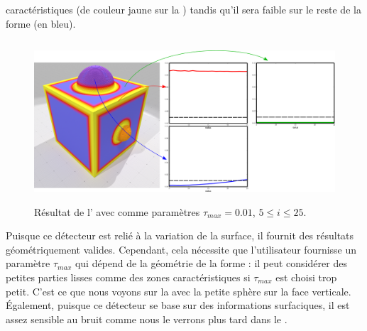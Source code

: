 caractéristiques (de couleur jaune sur la )
tandis qu'il sera faible sur le reste de la forme (en bleu).
%
\begin{figure}[ht]{
  \begin{center}
    \includegraphics[height=6cm]{figures/CubeSpherePlotPauly}
  \end{center}}
    \caption[Résultat de l']{Résultat de l' avec comme paramètres $\tau_{max} = 0.01$, $5 \le i \le 25$.
    \label{fig:pauly-cubesphere}}
\end{figure}
%
Puisque ce détecteur est relié à la variation de la surface, il fournit des
résultats géométriquement valides. Cependant, cela nécessite que l'utilisateur
fournisse un paramètre $\tau_{max}$ qui dépend de la géométrie de la forme : il
peut considérer des petites parties lisses comme des zones caractéristiques si
$\tau_{max}$ est choisi trop petit. C'est ce que nous voyons sur la
 avec la petite sphère sur la face verticale.
Également, puisque ce détecteur se base sur des informations surfaciques, il est
assez sensible au bruit comme nous le verrons plus tard dans le
.
%
